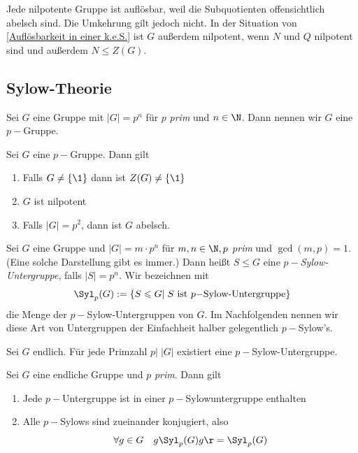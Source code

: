 \documentclass[11pt, a4paper]{article}
\begin{document}
\begin{note}
Jede nilpotente Gruppe ist auflösbar, weil die Subquotienten offensichtlich abelsch sind. Die Umkehrung gilt jedoch nicht. In der Situation von \ref{Auflösbarkeit in einer k.e.S.} ist $G$ außerdem nilpotent, wenn $N$ und $Q$ nilpotent sind und außerdem $N\leqslant Z(G)$.
\end{note}


\subsection{Sylow-Theorie}

\begin{definition} Sei $G$ eine Gruppe mit $|G|=p^n$ für $p$ \emph{prim} und $n\in \N$. Dann nennen wir $G$ eine $p-$Gruppe.
\end{definition}

\begin{lemma} Sei $G$ eine $p-$Gruppe. Dann gilt
\begin{enumerate}
\item Falls $G\neq \{\1\}$ dann ist $Z(G)\neq \{\1\}$
\item $G$ ist nilpotent
\item Falls $|G|=p^2$, dann ist $G$ abelsch.
\end{enumerate}
\end{lemma}

\begin{definition}
Sei $G$ eine Gruppe und $|G|= m\cdot p^n$ für $m,n\in \N, p$ \emph{prim} und $\gcd(m,p)=1$. (Eine solche Darstellung gibt es immer.) Dann heißt $S\leqslant G$ eine \emph{$p-$Sylow-Untergruppe}, falls $|S|=p^n$. Wir bezeichnen mit
$$\Syl_p(G):=\{S\leqslant G| \; S \text{ ist $p-$Sylow-Untergruppe}\}$$
die Menge der $p-$Sylow-Untergruppen von $G$. Im Nachfolgenden nennen wir diese Art von Untergruppen der Einfachheit halber gelegentlich $p-$Sylow's.

\end{definition}

\begin{theorem}
Sei $G$ endlich. Für jede Primzahl $p|\; |G|$ existiert eine $p-$Sylow-Untergruppe.
\end{theorem}

\begin{theorem} Sei $G$ eine endliche Gruppe und $p$ \emph{prim}. Dann gilt
\begin{enumerate}[label = \roman*)]
    \item Jede $p-$Untergruppe ist in einer $p-$Sylowuntergruppe enthalten
    \item Alle $p-$Sylows sind zueinander konjugiert, also 
    $$\forall g \in G \quad g\Syl_p(G)g\r = \Syl_p(G)$$
\end{enumerate}

\end{theorem}
\end{document}
